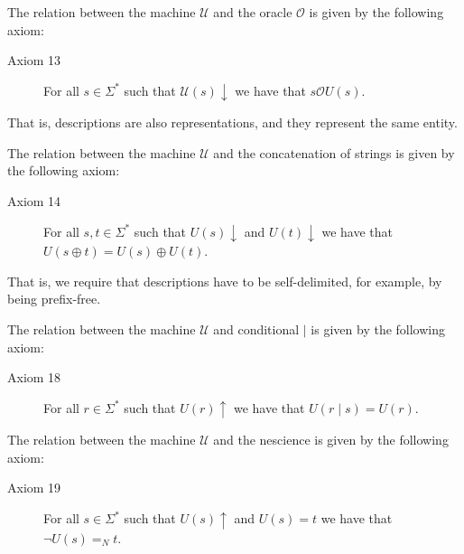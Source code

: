 \vskip 0.25cm

The relation between the machine $\mathcal{U}$ and the oracle $\mathcal{O}$ is given by the following axiom:

\vskip 0.25cm

\begin{description}
\item[Axiom 13] For all $s \in \Sigma^\ast$ such that $\mathcal{U}(s) \downarrow$ we have that $s \mathcal{O} U(s)$.
\end{description}

\vskip 0.25cm

That is, descriptions are also representations, and they represent the same entity.

\vskip 0.25cm

The relation between the machine $\mathcal{U}$ and the concatenation of strings is given by the following axiom:

\vskip 0.25cm

\begin{description}
\item[Axiom 14] For all $s, t \in \Sigma^\ast$ such that $U(s) \downarrow$ and $U(t) \downarrow$ we have that $U(s \oplus t) = U(s) \oplus U(t)$.
\end{description}

\vskip 0.25cm

That is, we require that descriptions have to be self-delimited, for example, by being prefix-free.


The relation between the machine $\mathcal{U}$ and conditional $\mid$ is given by the following axiom:

\vskip 0.25cm

\begin{description}
\item[Axiom 18] For all $r \in \Sigma^\ast$ such that $U(r) \uparrow$ we have that $U(r \mid s) = U(r)$.
\end{description}

\vskip 0.25cm

The relation between the machine $\mathcal{U}$ and the nescience is given by the following axiom:

\begin{description}
\item[Axiom 19] For all $s \in \Sigma^\ast$ such that $U(s) \uparrow$ and $U(s) = t$ we have that $\lnot U(s) =_N t$.
\end{description}

\vskip 0.25cm

